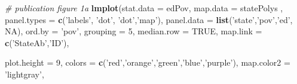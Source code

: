 \documentclass[
]{krantz}
\makeatletter
\newenvironment{Shaded}{\begin{snugshade}}{\end{snugshade}}
\newcommand{\CommentTok}[1]{\textcolor[rgb]{0.37,0.37,0.37}{\textit{#1}}}
\newcommand{\DataTypeTok}[1]{\textcolor[rgb]{0.27,0.27,0.27}{#1}}
\newcommand{\DecValTok}[1]{\textcolor[rgb]{0.06,0.06,0.06}{#1}}
\newcommand{\KeywordTok}[1]{\textcolor[rgb]{0.27,0.27,0.27}{\textbf{#1}}}
\newcommand{\NormalTok}[1]{#1}
\newcommand{\OtherTok}[1]{\textcolor[rgb]{0.37,0.37,0.37}{#1}}
\newcommand{\StringTok}[1]{\textcolor[rgb]{0.5,0.5,0.5}{#1}}
\newenvironment{kframe}{%
\medskip{}
\setlength{\fboxsep}{.8em}
 \def\at@end@of@kframe{}%
 \ifinner\ifhmode%
  \def\at@end@of@kframe{\end{minipage}}%
  \begin{minipage}{\columnwidth}%
 \fi\fi%
 \def\FrameCommand##1{\hskip\@totalleftmargin \hskip-\fboxsep
 \colorbox{shadecolor}{##1}\hskip-\fboxsep
     \hskip-\linewidth \hskip-\@totalleftmargin \hskip\columnwidth}%
 \MakeFramed {\advance\hsize-\width
   \@totalleftmargin\z@ \linewidth\hsize
   \@setminipage}}%
 {\par\unskip\endMakeFramed%
 \at@end@of@kframe}
\renewenvironment{Shaded}{\begin{kframe}}{\end{kframe}}
\makeatother
\begin{document}
\begin{Shaded}
\begin{Highlighting}[]
\CommentTok{# publication figure 1a}
\KeywordTok{lmplot}\NormalTok{(}\DataTypeTok{stat.data =}\NormalTok{ edPov,  }\DataTypeTok{map.data =}\NormalTok{ statePolys ,}
    \DataTypeTok{panel.types =} \KeywordTok{c}\NormalTok{(}\StringTok{'labels'}\NormalTok{, }\StringTok{'dot'}\NormalTok{, }\StringTok{'dot'}\NormalTok{,}\StringTok{'map'}\NormalTok{),}
    \DataTypeTok{panel.data =} \KeywordTok{list}\NormalTok{(}\StringTok{'state'}\NormalTok{,}\StringTok{'pov'}\NormalTok{,}\StringTok{'ed'}\NormalTok{, }\OtherTok{NA}\NormalTok{),}
    \DataTypeTok{ord.by =} \StringTok{'pov'}\NormalTok{,  }
    \DataTypeTok{grouping =} \DecValTok{5}\NormalTok{, }
    \DataTypeTok{median.row =} \OtherTok{TRUE}\NormalTok{,}
    \DataTypeTok{map.link =} \KeywordTok{c}\NormalTok{(}\StringTok{'StateAb'}\NormalTok{,}\StringTok{'ID'}\NormalTok{),}
    
    \DataTypeTok{plot.height =} \DecValTok{9}\NormalTok{,                            }
    \DataTypeTok{colors =} \KeywordTok{c}\NormalTok{(}\StringTok{'red'}\NormalTok{,}\StringTok{'orange'}\NormalTok{,}\StringTok{'green'}\NormalTok{,}\StringTok{'blue'}\NormalTok{,}\StringTok{'purple'}\NormalTok{), }
    \DataTypeTok{map.color2 =} \StringTok{'lightgray'}\NormalTok{,}
       

\end{Highlighting}
\end{Shaded}
\end{document}

